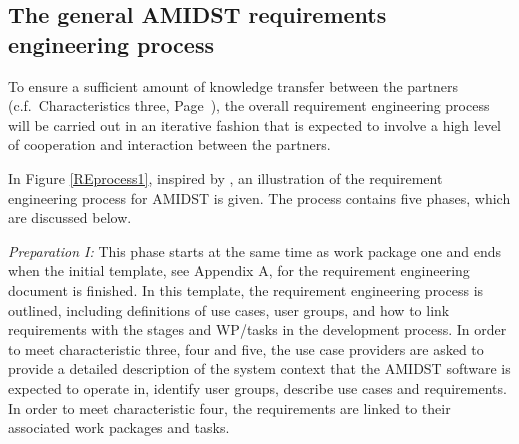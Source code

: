 


\subsection{The general AMIDST requirements engineering process}
\label{sec:reprocess}

To ensure a sufficient amount of knowledge transfer between the partners (c.f.\ Characteristics three, Page~\pageref{sec:characteristic3}),
the overall  requirement engineering process will be carried out in an iterative fashion that is expected to involve a
high level of cooperation and interaction between the partners.  

In Figure \ref{REprocess1}, inspired by \cite{Ebe10}, an illustration of the requirement engineering process for AMIDST is given.  The process contains five phases, which are discussed below.

\emph{Preparation I:}  This phase starts at the same time as work package one and ends when the initial template,
see Appendix A, for the requirement engineering document is finished.  In this template, the requirement engineering process
is outlined, including definitions of use cases, user groups, and how to link requirements with the stages and WP/tasks
in the development process.  In order to meet characteristic three, four and five, the use case providers are asked to
provide a detailed description of the system context that the AMIDST software is expected to operate in, identify user
groups, describe use cases and requirements.  In order to meet characteristic four, the requirements are linked to their
associated work packages and tasks. 

